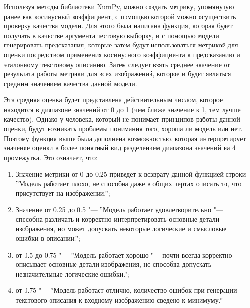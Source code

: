 \documentclass[bachelor, och, coursework]{SCWorks}
\begin{document}
        Используя методы библиотеки NumPy, можно создать метрику, упомянутую
        ранее как косинусный коэффициент, с помощью которой можно осуществить
        проверку качества модели. Для этого была написана функция, которая будет
        получать в качестве аргумента тестовую выборку, и с помощью модели
        генерировать предсказания, которые затем будут использоваться метрикой
        для оценки посредством применения косинусного коэффициента к
        предсказанию и эталонному текстовому описанию. Затем следует взять
        среднее значение от результата работы метрики для всех изображений,
        которое и будет являться средним значением качества данной модели.
        
        Эта средняя оценка будет представлена действительным числом, которое
        находится в диапазоне значений от 0 до 1 (чем ближе значение к 1, тем
        лучше качество). Однако у человека, который не понимает принципов работы
        данной оценки, будут возникать проблемы понимания того, хороша ли модель
        или нет. Поэтому функция выше была дополнена возможностью, которая
        интерпретирует значение оценки в более понятный вид разделением
        диапазона значений на 4 промежутка. Это означает, что:
        
        \begin{enumerate}
            \item Значение метрики от 0 до 0.25 приведет к возврату данной
            функцией строки ''Модель работает плохо, не способна даже в общих
            чертах описать то, что присутствует на изображении.'';
            \item Значение от 0.25 до 0.5 "--- ''Модель работает
            удовлетворительно "--- способна различать и корректно
            интерпретировать основные детали изображения, но может допускать
            некоторые логические и смысловые ошибки в описании.'';
            \item от 0.5 до 0.75 "--- ''Модель работает хорошо "--- почти всегда
            корректно описывает основные детали изображения, но способна
            допускать незначительные логические ошибки.'';
            \item от 0.75 "--- ''Модель работает отлично, количество ошибок при
            генерации текстового описания к входному изображению сведено к
            минимуму.''
        \end{enumerate}
\end{document}
